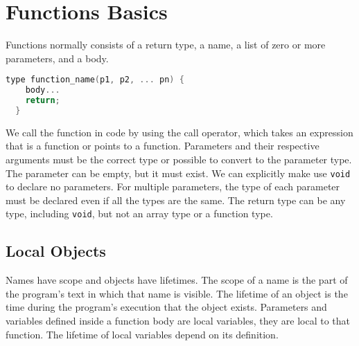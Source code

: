 \documentclass[12pt, a4paper]{report}
\begin{document}
\section{Functions Basics}
Functions normally consists of a return type, a name, a list of zero or more parameters, and a body.
\begin{lstlisting}[language=C++]
  type function_name(p1, p2, ... pn) {
    body...
    return;
  }
\end{lstlisting}
We call the function in code by using the call operator, which takes an expression that is a function or points to a function.
Parameters and their respective arguments must be the correct type or possible to convert to the parameter type.
The parameter can be empty, but it must exist.
We can explicitly make use \verb|void| to declare no parameters.
For multiple parameters, the type of each parameter must be declared even if all the types are the same.
The return type can be any type, including \verb|void|, but not an array type or a function type.
\subsection{Local Objects}
Names have scope and objects have lifetimes.
The scope of a name is the part of the program's text in which that name is visible.
The lifetime of an object is the time during the program's execution that the object exists.
Parameters and variables defined inside a function body are local variables, they are local to that function.
The lifetime of local variables depend on its definition.
\end{document}
